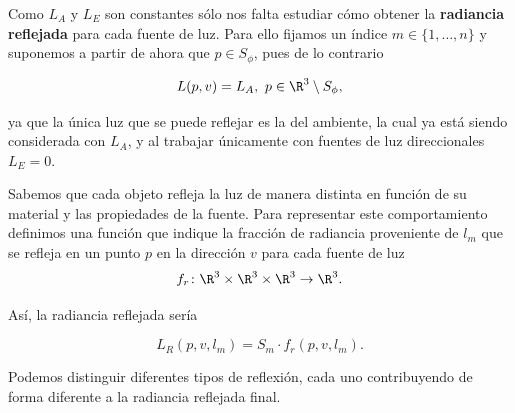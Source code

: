 Como $L_A$ y $L_E$ son constantes sólo nos falta estudiar cómo obtener la \textbf{radiancia reflejada} para cada fuente de luz. Para ello fijamos un índice $m\in \{1,\dots,n\}$ y suponemos a partir de ahora que $p\in S_{\phi}$, pues de lo contrario

\begin{equation*}
    L(p,v) = L_A,\ p\in \R^3\setminus S_{\phi},
\end{equation*}

ya que la única luz que se puede reflejar es la del ambiente, la cual ya está siendo considerada con $L_A$, y al trabajar únicamente con fuentes de luz direccionales $L_E=0$. \newline

Sabemos que cada objeto refleja la luz de manera distinta en función de su material y las propiedades de la fuente. Para representar este comportamiento definimos una función que indique la fracción de radiancia proveniente de $l_m$ que se refleja en un punto $p$ en la dirección $v$ para cada fuente de luz
\begin{equation*}
    f_r \colon \R^3\times \R^3\times \R^3 \to \R^3.
\end{equation*}

Así, la radiancia reflejada sería

\begin{equation*}
    L_R(p,v,l_m) = S_m\cdot f_r(p,v,l_m).
\end{equation*}

Podemos distinguir diferentes tipos de reflexión, cada uno contribuyendo de forma diferente a la radiancia reflejada final.

